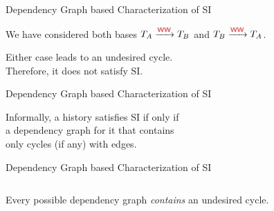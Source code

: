 \begin{frame}{Dependency Graph based Characterization of SI}
  \begin{center}
		We have considered both bases $T_{A} \xrightarrow{\textcolor{red}{\textup{\textsf{WW}}}} T_{B}$
		and $T_{B} \xrightarrow{\textcolor{red}{\textup{\textsf{WW}}}} T_{A}$.

		\vspace{0.20cm}
		\vspace{0.20cm}

		Either case leads to an undesired cycle. \\[2pt]
		Therefore, it does not satisfy SI.
  \end{center}
\end{frame}

\begin{frame}{Dependency Graph based Characterization of SI}
  \begin{theorem}
		Informally, a history satisfies SI if only if \\[3pt]
		 a dependency graph for it that contains \\[3pt]
		only cycles (if any) with  edges.
	\end{theorem}

	\vspace{0.50cm}
	\begin{center}
	\end{center}
\end{frame}

\begin{frame}{Dependency Graph based Characterization of SI}
	\begin{columns}
			{}
			{}
	\end{columns}

	\vspace{0.30cm}
	\begin{center}
		Every possible dependency graph {\it contains}
		an undesired  cycle.
	\end{center}
\end{frame}


